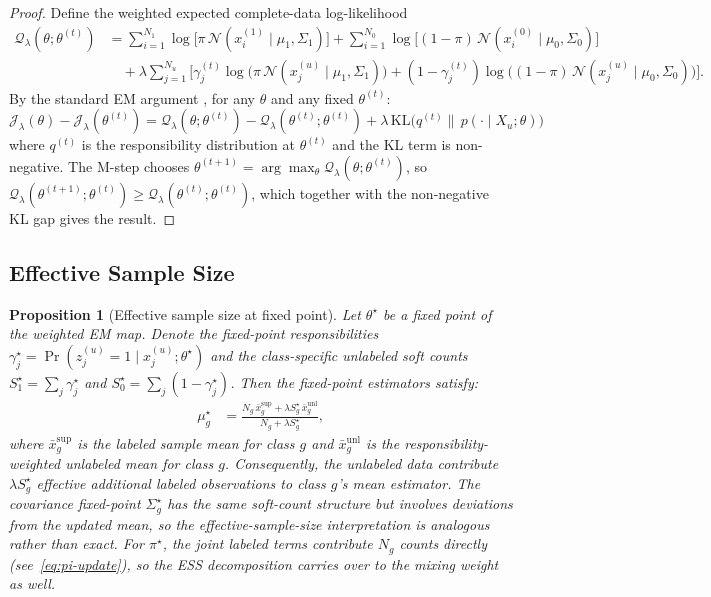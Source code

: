 \documentclass[11pt]{article}
\newtheorem{proposition}{Proposition}
\theoremstyle{definition}
\newcommand{\calJ}{\mathcal{J}}
\newcommand{\calN}{\mathcal{N}}
\newcommand{\lam}{\lambda}
\newcommand{\Sig}{\Sigma}
\newcommand{\calQ}{\mathcal{Q}}
\begin{document}
\begin{proof}
Define the weighted expected complete-data log-likelihood
\begin{align*}
\calQ_\lam(\theta;\theta^{(t)})
&= \sum_{i=1}^{N_1}\log\!\big[\pi\,\calN(x_i^{(1)}\mid\mu_1,\Sig_1)\big]
 + \sum_{i=1}^{N_0}\log\!\big[(1-\pi)\,\calN(x_i^{(0)}\mid\mu_0,\Sig_0)\big] \\
&\quad +\lam\sum_{j=1}^{N_u}\Big[
  \gamma_j^{(t)}\log\big(\pi\,\calN(x_j^{(u)}\mid\mu_1,\Sig_1)\big)
 +(1-\gamma_j^{(t)})\log\big((1-\pi)\,\calN(x_j^{(u)}\mid\mu_0,\Sig_0)\big)
\Big].
\end{align*}
By the standard EM argument \citep{dempster1977maximum},
for any \(\theta\) and any fixed \(\theta^{(t)}\):
\[
\calJ_\lam(\theta) - \calJ_\lam(\theta^{(t)})
= \calQ_\lam(\theta;\theta^{(t)}) - \calQ_\lam(\theta^{(t)};\theta^{(t)})
+ \lam\,\mathrm{KL}\!\big(q^{(t)}\big\|\,p(\cdot\mid X_u;\theta)\big)
\]
where \(q^{(t)}\) is the responsibility distribution at \(\theta^{(t)}\) and
the KL term is non-negative.
The M-step chooses \(\theta^{(t+1)}=\arg\max_\theta\calQ_\lam(\theta;\theta^{(t)})\),
so \(\calQ_\lam(\theta^{(t+1)};\theta^{(t)})\geq\calQ_\lam(\theta^{(t)};\theta^{(t)})\),
which together with the non-negative KL gap gives the result.
\end{proof}

\subsection{Effective Sample Size}

\begin{proposition}[Effective sample size at fixed point]
\label{prop:ess}
Let \(\theta^\star\) be a fixed point of the weighted EM map.
Denote the fixed-point responsibilities
\(\gamma_j^\star = \Pr(z_j^{(u)}=1\mid x_j^{(u)};\theta^\star)\)
and the class-specific unlabeled soft counts
\(S_1^\star = \sum_j\gamma_j^\star\) and
\(S_0^\star = \sum_j(1-\gamma_j^\star)\).
Then the fixed-point estimators satisfy:
\begin{align*}
\mu_g^\star &= \frac{N_g\,\bar{x}_g^{\mathrm{sup}} + \lam S_g^\star\,\bar{x}_g^{\mathrm{unl}}}
                    {N_g + \lam S_g^\star},
\end{align*}
where \(\bar{x}_g^{\mathrm{sup}}\) is the labeled sample mean for class \(g\)
and \(\bar{x}_g^{\mathrm{unl}}\) is the responsibility-weighted unlabeled mean
for class \(g\).
Consequently, the unlabeled data contribute \(\lam S_g^\star\) effective
additional labeled observations to class \(g\)'s mean estimator.
The covariance fixed-point \(\Sig_g^\star\) has the same soft-count
structure but involves deviations from the updated mean, so the
effective-sample-size interpretation is analogous rather than exact.
For \(\pi^\star\), the joint labeled terms contribute \(N_g\) counts
directly (see~\eqref{eq:pi-update}), so the ESS decomposition carries
over to the mixing weight as well.
\end{proposition}
\end{document}
